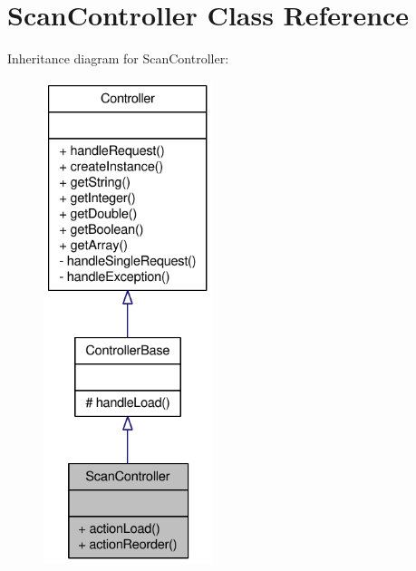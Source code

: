 \hypertarget{classScanController}{
\section{ScanController Class Reference}
\label{classScanController}
}


Inheritance diagram for ScanController:\nopagebreak
\begin{figure}[H]
\begin{center}
\leavevmode
\includegraphics[height=400pt]{classScanController__inherit__graph}
\end{center}
\end{figure}



